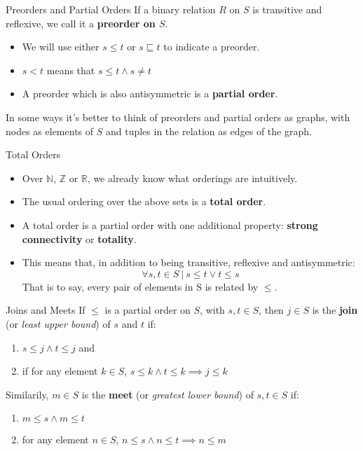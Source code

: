 \documentclass[11pt]{beamer}
\begin{document}
\begin{frame}[fragile=singleslide]{Preorders and Partial Orders}
If a binary relation $R$ on $S$ is transitive and reflexive, we call it a \textbf{preorder on $S$}.
\begin{itemize}
\item We will use either $s \leq t$ or $s \sqsubseteq t$ to indicate a preorder.  
\item $s < t$ means that $s \leq t \land s \neq t$ 
\item A preorder which is also antisymmetric is a \textbf{partial order}.
\end{itemize}
In some ways it's better to think of preorders and partial orders as graphs, with nodes as elements of $S$ and tuples in the relation as edges of the graph.
\end{frame}

\begin{frame}[fragile=singleslide]{Total Orders}
\begin{itemize}
\item Over $\mathbb{N}$, $\mathbb{Z}$ or $\mathbb{R}$, we already know what orderings are intuitively.
\item The usual ordering over the above sets is a \textbf{total order}.  
\item A total order is a partial order with one additional property: \textbf{strong connectivity} or \textbf{totality}.
\item This means that, in addition to being transitive, reflexive and antisymmetric:
\begin{equation}
\forall s, t \in S \:|\: s \leq t \lor t \leq s
\end{equation}
That is to say, every pair of elements in S is related by $\leq$.  
\end{itemize}
\end{frame}

\begin{frame}[fragile=singleslide]{Joins and Meets}
If $\leq$ is a partial order on $S$, with $s,t \in S$, then $j \in S$ is the \textbf{join} (or \emph{least upper bound}) of $s$ and $t$ if:
\begin{enumerate}
\item $s \leq j \land t \leq j$ and
\item if for any element $k \in S$, $s \leq k \land t \leq k \implies j \leq k $  
\end{enumerate}
Similarily, $m \in S$ is the \textbf{meet} (or \emph{greatest lower bound}) of $s,t \in S$ if:
\begin{enumerate}
\item $m \leq s \land m \leq t$ 
\item for any element $n \in S$, $n \leq s \land n \leq t \implies n \leq m$
\end{enumerate}   
\end{frame}
\end{document}

